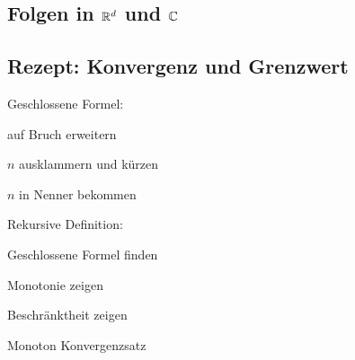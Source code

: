 \subsection{Folgen in $\mathbb{R}^{d}$ und $\mathbb{C}$}

\subsection{Rezept: Konvergenz und Grenzwert}
\begin{compactdesc}
    \item[Geschlossene Formel:]
        \begin{inparaitem}
            \item auf Bruch erweitern
            \item $n$ ausklammern und kürzen
            \item $n$ in Nenner bekommen
        \end{inparaitem}
    \item[Rekursive Definition:]
        \begin{inparaitem}
            \item Geschlossene Formel finden
            \item 
                \begin{inparaenum}
                    \item Monotonie zeigen
                    \item Beschränktheit zeigen
                    \item Monoton Konvergenzsatz
                \end{inparaenum}
        \end{inparaitem}
\end{compactdesc}

